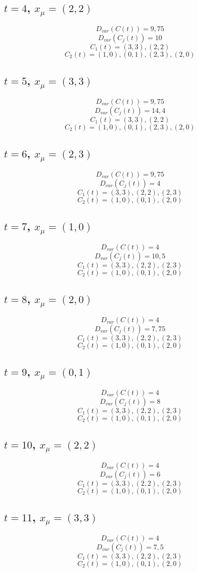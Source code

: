 \subsection*{$t = 4$, $x_{\mu} = (2,2)$}
\[D_{var}(C(t)) = 9,75\]
\[D_{var}(C_{j}(t)) = 10\]
\[C_{1}(t) = {(3,3),(2,2)}\]
\[C_{2}(t) = {(1,0),(0,1),(2,3),(2,0)}\]

\subsection*{$t = 5$, $x_{\mu} = (3,3)$}
\[D_{var}(C(t)) = 9,75\]
\[D_{var}(C_{j}(t)) = 14,4\]
\[C_{1}(t) = {(3,3),(2,2)}\]
\[C_{2}(t) = {(1,0),(0,1),(2,3),(2,0)}\]

\subsection*{$t = 6$, $x_{\mu} = (2,3)$}
\[D_{var}(C(t)) = 9,75\]
\[D_{var}(C_{j}(t)) = 4\]
\[C_{1}(t) = {(3,3),(2,2),(2,3)}\]
\[C_{2}(t) = {(1,0),(0,1),(2,0)}\]

\subsection*{$t = 7$, $x_{\mu} = (1,0)$}
\[D_{var}(C(t)) = 4\]
\[D_{var}(C_{j}(t)) = 10,5\]
\[C_{1}(t) = {(3,3),(2,2),(2,3)}\]
\[C_{2}(t) = {(1,0),(0,1),(2,0)}\]

\subsection*{$t = 8$, $x_{\mu} = (2,0)$}
\[D_{var}(C(t)) = 4\]
\[D_{var}(C_{j}(t)) = 7,75\]
\[C_{1}(t) = {(3,3),(2,2),(2,3)}\]
\[C_{2}(t) = {(1,0),(0,1),(2,0)}\]

\subsection*{$t = 9$, $x_{\mu} = (0,1)$}
\[D_{var}(C(t)) = 4\]
\[D_{var}(C_{j}(t)) = 8\]
\[C_{1}(t) = {(3,3),(2,2),(2,3)}\]
\[C_{2}(t) = {(1,0),(0,1),(2,0)}\]

\subsection*{$t = 10$, $x_{\mu} = (2,2)$}
\[D_{var}(C(t)) = 4\]
\[D_{var}(C_{j}(t)) = 6\]
\[C_{1}(t) = {(3,3),(2,2),(2,3)}\]
\[C_{2}(t) = {(1,0),(0,1),(2,0)}\]

\subsection*{$t = 11$, $x_{\mu} = (3,3)$}
\[D_{var}(C(t)) = 4\]
\[D_{var}(C_{j}(t)) = 7,5\]
\[C_{1}(t) = {(3,3),(2,2),(2,3)}\]
\[C_{2}(t) = {(1,0),(0,1),(2,0)}\]

